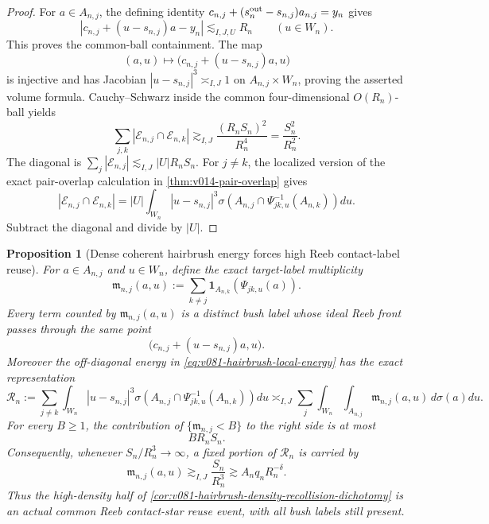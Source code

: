 \documentclass[10pt]{article}
\newtheorem{proposition}[theorem]{Proposition}
\begin{document}
\begin{proof}
For \(a\in A_{n,j}\), the defining identity
\(c_{n,j}+(s_n^{\rm out}-s_{n,j})a_{n,j}=y_n\) gives
\[
\left|
c_{n,j}+(u-s_{n,j})a-y_n
\right|
\lesssim_{I,J,U}R_n
\qquad
(u\in W_n).
\]
This proves the common-ball containment.  The map
\[
(a,u)\longmapsto\bigl(c_{n,j}+(u-s_{n,j})a,u\bigr)
\]
is injective and has Jacobian \(|u-s_{n,j}|^3\asymp_{I,J}1\) on
\(A_{n,j}\times W_n\), proving the asserted volume formula.  Cauchy--Schwarz inside the common
four-dimensional \(O(R_n)\)-ball yields
\[
\sum_{j,k}|\mathcal E_{n,j}\cap\mathcal E_{n,k}|
\gtrsim_{I,J}
\frac{(R_nS_n)^2}{R_n^4}
=
\frac{S_n^2}{R_n^2}.
\]
The diagonal is
\(\sum_j|\mathcal E_{n,j}|\lesssim_{I,J}|U|R_nS_n\).  For \(j\ne k\), the localized version
of the exact pair-overlap calculation in
\cref{thm:v014-pair-overlap} gives
\[
|\mathcal E_{n,j}\cap\mathcal E_{n,k}|
=
|U|\int_{W_n}|u-s_{n,j}|^3
\sigma\!\left(A_{n,j}\cap\Psi_{jk,u}^{-1}(A_{n,k})\right)du.
\]
Subtract the diagonal and divide by \(|U|\).
\end{proof}

\begin{proposition}[Dense coherent hairbrush energy forces high Reeb contact-label reuse]
\label{prop:v081-hairbrush-high-label-reuse}
For \(a\in A_{n,j}\) and \(u\in W_n\), define the exact target-label multiplicity
\begin{equation}
\label{eq:v081-hairbrush-label-multiplicity}
\mathfrak m_{n,j}(a,u)
:=
\sum_{k\ne j}
\mathbf 1_{A_{n,k}}\!\left(\Psi_{jk,u}(a)\right).
\end{equation}
Every term counted by \(\mathfrak m_{n,j}(a,u)\) is a distinct bush label whose ideal Reeb front
passes through the same point
\[
\bigl(c_{n,j}+(u-s_{n,j})a,u\bigr).
\]
Moreover the off-diagonal energy in
\eqref{eq:v081-hairbrush-local-energy} has the exact representation
\begin{equation}
\label{eq:v081-hairbrush-energy-as-reuse}
\boxed{
\mathcal R_n
:=
\sum_{j\ne k}\int_{W_n}|u-s_{n,j}|^3
\sigma\!\left(A_{n,j}\cap\Psi_{jk,u}^{-1}(A_{n,k})\right)du
\asymp_{I,J}
\sum_j\int_{W_n}\int_{A_{n,j}}
\mathfrak m_{n,j}(a,u)\,d\sigma(a)du.
}
\end{equation}
For every \(B\ge1\), the contribution of
\(\{\mathfrak m_{n,j}<B\}\) to the right side is at most
\begin{equation}
\label{eq:v081-hairbrush-low-reuse-bound}
\boxed{BR_nS_n.}
\end{equation}
Consequently, whenever \(S_n/R_n^3\to\infty\), a fixed portion of \(\mathcal R_n\) is carried by
\begin{equation}
\label{eq:v081-hairbrush-high-reuse-threshold}
\boxed{
\mathfrak m_{n,j}(a,u)
\gtrsim_{I,J}
\frac{S_n}{R_n^3}
\gtrsim
A_nq_nR_n^{-\delta}.
}
\end{equation}
Thus the high-density half of
\cref{cor:v081-hairbrush-density-recollision-dichotomy} is an actual common Reeb contact-star
reuse event, with all bush labels still present.
\end{proposition}
\end{document}
